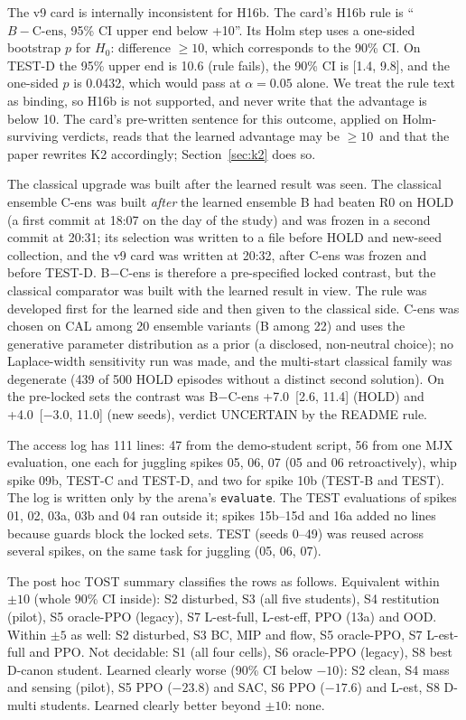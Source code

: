 The v9 card is internally inconsistent for H16b. The card's H16b rule is ``$B-\text{C-ens}$, 95\% CI upper end below +10\pp''. Its Holm step uses a one-sided bootstrap $p$ for $H_0$: difference $\ge 10$, which corresponds to the 90\% CI. On TEST-D the 95\% upper end is 10.6 (rule fails), the 90\% CI is [1.4, 9.8], and the one-sided $p$ is 0.0432, which would pass at $\alpha=0.05$ alone. We treat the rule text as binding, so H16b is not supported, and never write that the advantage is below 10\pp. The card's pre-written sentence for this outcome, applied on Holm-surviving verdicts, reads that the learned advantage may be $\ge10$\pp\ and that the paper rewrites K2 accordingly; Section~\ref{sec:k2} does so.

The classical upgrade was built after the learned result was seen. The classical ensemble C-ens was built \emph{after} the learned ensemble B had beaten R0 on HOLD (a first commit at 18:07 on the day of the study) and was frozen in a second commit at 20:31; its selection was written to a file before HOLD and new-seed collection, and the v9 card was written at 20:32, after C-ens was frozen and before TEST-D. B$-$C-ens is therefore a pre-specified locked contrast, but the classical comparator was built with the learned result in view. The rule was developed first for the learned side and then given to the classical side. C-ens was chosen on CAL among 20 ensemble variants (B among 22) and uses the generative parameter distribution as a prior (a disclosed, non-neutral choice); no Laplace-width sensitivity run was made, and the multi-start classical family was degenerate (439 of 500 HOLD episodes without a distinct second solution). On the pre-locked sets the contrast was B$-$C-ens +7.0\pp\ [2.6, 11.4] (HOLD) and +4.0\pp\ [$-3.0$, 11.0] (new seeds), verdict UNCERTAIN by the README rule.

The access log has 111 lines: 47 from the demo-student script, 56 from one MJX evaluation, one each for juggling spikes 05, 06, 07 (05 and 06 retroactively), whip spike 09b, TEST-C and TEST-D, and two for spike 10b (TEST-B and TEST). The log is written only by the arena's \texttt{evaluate}. The TEST evaluations of spikes 01, 02, 03a, 03b and 04 ran outside it; spikes 15b--15d and 16a added no lines because guards block the locked sets. TEST (seeds 0--49) was reused across several spikes, on the same task for juggling (05, 06, 07).

The post hoc TOST summary classifies the rows as follows. Equivalent within $\pm10$ (whole 90\% CI inside): S2 disturbed, S3 (all five students), S4 restitution (pilot), S5 oracle-PPO (legacy), S7 L-est-full, L-est-eff, PPO (13a) and OOD. Within $\pm5$ as well: S2 disturbed, S3 BC, MIP and flow, S5 oracle-PPO, S7 L-est-full and PPO. Not decidable: S1 (all four cells), S6 oracle-PPO (legacy), S8 best D-canon student. Learned clearly worse (90\% CI below $-10$): S2 clean, S4 mass and sensing (pilot), S5 PPO ($-23.8$) and SAC, S6 PPO ($-17.6$) and L-est, S8 D-multi students. Learned clearly better beyond $\pm10$: none.

